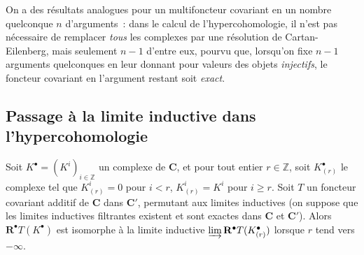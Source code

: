On a des résultats analogues pour un multifoncteur covariant en un nombre
quelconque $n$ d'arguments~: dans le calcul de l'hypercohomologie, il n'est pas
nécessaire de remplacer \emph{tous} les complexes par une résolution de
Cartan-Eilenberg, mais seulement $n-1$ d'entre eux, pourvu que, lorsqu'on fixe
$n-1$ arguments quelconques en leur donnant pour valeurs des objets
\emph{injectifs}, le foncteur covariant en l'argument restant soit
\emph{exact}.

\subsection{Passage à la limite inductive dans l'hypercohomologie}
\label{subsection:0.11.5-fr}

\begin{lemma}[11.5.1]
\label{0.11.5.1-fr}
Soit $K^\bullet=(K^i)_{i\in\mathbb Z}$ un complexe de $\boldsymbol{C}$, et pour
tout entier $r\in\mathbb Z$, soit $K_{(r)}^\bullet$ le complexe tel que
$K_{(r)}^i=0$ pour $i<r$, $K_{(r)}^i=K^i$ pour $i\geq r$. Soit $T$ un
foncteur covariant additif
de $\boldsymbol{C}$ dans $\boldsymbol{C}'$, permutant aux
limites inductives (on suppose que les limites inductives filtrantes existent
et sont exactes dans $\boldsymbol{C}$ et $\boldsymbol{C}'$). Alors
$\mathbf R^\bullet T(K^\bullet)$ est isomorphe à la limite inductive
$\varinjlim\mathbf R^\bullet T(K_{(r)}^\bullet)$
lorsque $r$ tend vers $-\infty$.
\end{lemma}

